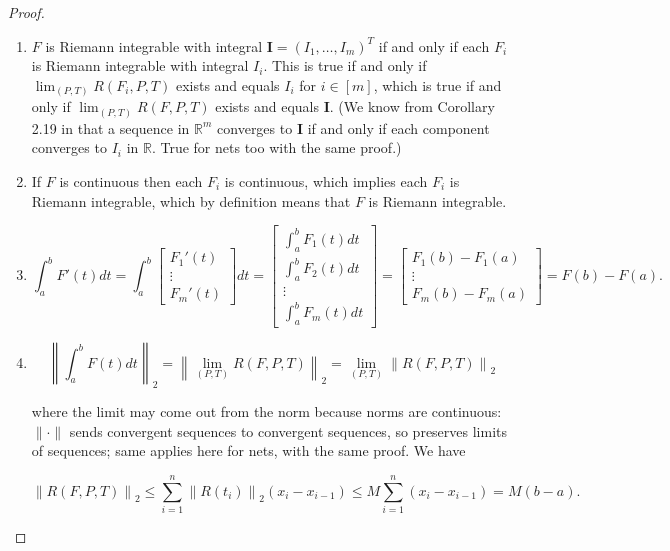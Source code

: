 \begin{proof}

\begin{enumerate}

\item \(F\) is Riemann integrable with integral \(\boldsymbol{I} = (I_1, \ldots, I_m)^T\) if and only if each \(F_i\) is Riemann integrable with integral \(I_i\). This is true if and only if \(\lim_{(P,T)} R(F_i, P, T) \) exists and equals \(I_i\) for \(i \in [m]\), which is true if and only if \(\lim_{(P,T)} R(F, P, T) \) exists and equals \(\boldsymbol{I}\). (We know from Corollary 2.19 in \citet{pugh2015real} that a sequence in \(\mathbb{R}^m\) converges to \(\boldsymbol{I}\) if and only if each component converges to \(I_i\) in \(\mathbb{R}\). True for nets too with the same proof.)

\item If \(F\) is continuous then each \(F_i\) is continuous, which implies each \(F_i\) is Riemann integrable, which by definition means that \(F\) is Riemann integrable.

\item 

\[
\int_a^b F'(t) dt = \int_a^b \begin{bmatrix} F_1'(t) \\ \vdots \\ F_m'(t) \end{bmatrix} dt = \begin{bmatrix} \int_a^bF_1(t) dt \\  \int_a^bF_2(t) dt \\ \vdots \\  \int_a^bF_m (t) dt \end{bmatrix} = \begin{bmatrix} F_1(b) - F_1(a) \\ \vdots \\  F_m(b) - F_m(a) \end{bmatrix} = F(b) - F(a).
\]

\item 

\[
\left\lVert \int_a^b F(t) dt \right\rVert_2 = \left\lVert \lim_{(P,T)} R(F, P, T) \right\rVert_2   =  \lim_{(P,T)} \left\lVert R(F, P, T) \right\rVert_2 
\]

where the limit may come out from the norm because norms are continuous: \(\lVert \cdot \rVert\) sends convergent sequences to convergent sequences, so preserves limits of sequences; same applies here for nets, with the same proof. We have 

\[
\left\lVert R(F, P, T) \right\rVert_2  \leq \sum_{i=1}^n \left\lVert R(t_i) \right\rVert_2 (x_i - x_{i-1}) \leq M \sum_{i=1}^n(x_i - x_{i-1})  = M(b-a).
\]

\end{enumerate}

\end{proof}

